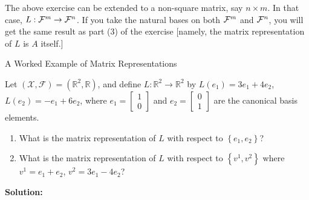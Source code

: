 \documentclass[11pt,twoside]{nsf_jwg} %
\begin{document}
\vspace*{.3in}

 The above exercise can be extended to a non-square matrix, say $n \times m$. In that case,  $L: {\cal F}^m \to {\cal F}^n$. If you take the natural bases on both ${\cal F}^m$ and ${\cal F}^n$, you will get the same result as part (3) of the exercise [namely, the matrix representation of $L$ is $A$ itself.]

\newpage

{\Large \bf
\begin{center}
A Worked Example of Matrix Representations
\end{center}
}
\Large

Let $\left(\mathcal{X},\mathcal{F}\right)=\left({\mathbb R}^{2},{\mathbb R}\right)$,
and define $L:{\mathbb R}^{2}\rightarrow{\mathbb R}^{2}$ by $L\left(e_{1}\right)=3e_{1}+4e_{2}$,
$L\left(e_{2}\right)=-e_{1}+6e_{2}$, where $e_{1}=\begin{bmatrix}1\\
0
\end{bmatrix}$ and $e_{2}=\begin{bmatrix}0\\
1
\end{bmatrix}$ are the canonical basis elements.
\begin{enumerate}
\item What is the matrix representation of $L$ with respect to $\left\{ e_{1},e_{2}\right\} $?
\item What is the matrix representation of $L$ with respect to $\left\{ v^{1},v^{2}\right\} $
where $v^{1}=e_{1}+e_{2}$, $v^{2}=3e_{1}-4e_{2}$?
\end{enumerate}
\textbf{Solution:}
\end{document}
